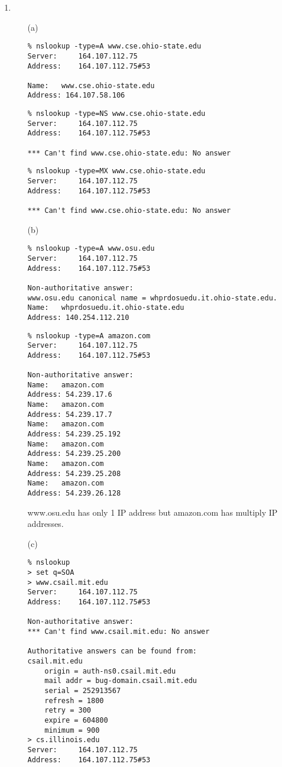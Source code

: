 \documentclass[12pt]{article}
\begin{document}
\begin{singlespace}
\begin{enumerate}
\item
	\begin{itemize}
	\item[(a)]
		\begin{lstlisting}
% nslookup -type=A www.cse.ohio-state.edu
Server:		164.107.112.75
Address:	164.107.112.75#53

Name:	www.cse.ohio-state.edu
Address: 164.107.58.106
		\end{lstlisting}
		\begin{lstlisting}
% nslookup -type=NS www.cse.ohio-state.edu
Server:		164.107.112.75
Address:	164.107.112.75#53

*** Can't find www.cse.ohio-state.edu: No answer
		\end{lstlisting}
		\begin{lstlisting}
% nslookup -type=MX www.cse.ohio-state.edu
Server:		164.107.112.75
Address:	164.107.112.75#53

*** Can't find www.cse.ohio-state.edu: No answer
		\end{lstlisting}
	\item[(b)]
		\begin{lstlisting}
% nslookup -type=A www.osu.edu
Server:		164.107.112.75
Address:	164.107.112.75#53

Non-authoritative answer:
www.osu.edu	canonical name = whprdosuedu.it.ohio-state.edu.
Name:	whprdosuedu.it.ohio-state.edu
Address: 140.254.112.210
		\end{lstlisting}
		\begin{lstlisting}
% nslookup -type=A amazon.com
Server:		164.107.112.75
Address:	164.107.112.75#53

Non-authoritative answer:
Name:	amazon.com
Address: 54.239.17.6
Name:	amazon.com
Address: 54.239.17.7
Name:	amazon.com
Address: 54.239.25.192
Name:	amazon.com
Address: 54.239.25.200
Name:	amazon.com
Address: 54.239.25.208
Name:	amazon.com
Address: 54.239.26.128
		\end{lstlisting}
		www.osu.edu has only 1 IP address but amazon.com has multiply IP addresses.
	\item[(c)]
		\begin{lstlisting}
% nslookup
> set q=SOA
> www.csail.mit.edu
Server:		164.107.112.75
Address:	164.107.112.75#53

Non-authoritative answer:
*** Can't find www.csail.mit.edu: No answer

Authoritative answers can be found from:
csail.mit.edu
	origin = auth-ns0.csail.mit.edu
	mail addr = bug-domain.csail.mit.edu
	serial = 252913567
	refresh = 1800
	retry = 300
	expire = 604800
	minimum = 900
> cs.illinois.edu
Server:		164.107.112.75
Address:	164.107.112.75#53


\end{lstlisting}
\end{itemize}
\end{enumerate}
\end{singlespace}
\end{document}
